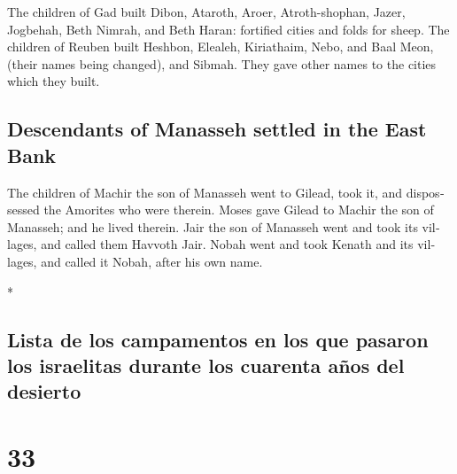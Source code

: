 \begin{paracol}{2}
\begin{otherlanguage}{english}
 The children of Gad built Dibon, Ataroth, Aroer,
 Atroth-shophan, Jazer, Jogbehah,  Beth
Nimrah, and Beth Haran: fortified cities and folds for sheep.
 The children of Reuben built Heshbon, Elealeh,
Kiriathaim,  Nebo, and Baal Meon, (their names being
changed), and Sibmah. They gave other names to the cities which they
built.

\hypertarget{descendants-of-manasseh-settled-in-the-east-bank}{%
\subsection{Descendants of Manasseh settled in the East
Bank}\label{descendants-of-manasseh-settled-in-the-east-bank}}

 The children of Machir the son of Manasseh went to
Gilead, took it, and dispossessed the Amorites who were therein.
 Moses gave Gilead to Machir the son of Manasseh; and he
lived therein.  Jair the son of Manasseh went and took
its villages, and called them Havvoth Jair.  Nobah went
and took Kenath and its villages, and called it Nobah, after his own
name.

\end{otherlanguage}

\switchcolumn[0]*

\hypertarget{lista-de-los-campamentos-en-los-que-pasaron-los-israelitas-durante-los-cuarenta-auxf1os-del-desierto}{%
\subsection{Lista de los campamentos en los que pasaron los israelitas
durante los cuarenta años del
desierto}\label{lista-de-los-campamentos-en-los-que-pasaron-los-israelitas-durante-los-cuarenta-auxf1os-del-desierto}}

\hypertarget{section-64}{%
\section{33}\label{section-64}}


\end{paracol}
